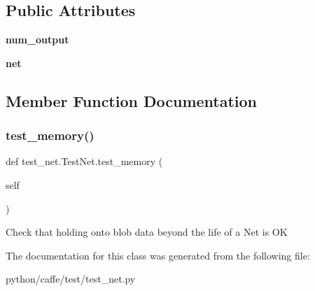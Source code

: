 \subsection*{Public Attributes}
\begin{DoxyCompactItemize}
\item 
\mbox{\label{classtest__net_1_1_test_net_a99560ae34dd066167207d66a4a895a8e}} 
{\bfseries num\+\_\+output}
\item 
\mbox{\label{classtest__net_1_1_test_net_ac07e8487d9fb78ea828aa890f09c2bff}} 
{\bfseries net}
\end{DoxyCompactItemize}


\subsection{Member Function Documentation}
\mbox{\label{classtest__net_1_1_test_net_a124e87079f074a8333dd71e9742e6118}} 
\subsubsection{\texorpdfstring{test\+\_\+memory()}{test\_memory()}}
{\footnotesize\ttfamily def test\+\_\+net.\+Test\+Net.\+test\+\_\+memory (\begin{DoxyParamCaption}\item[{}]{self }\end{DoxyParamCaption})}

\begin{DoxyVerb}Check that holding onto blob data beyond the life of a Net is OK\end{DoxyVerb}
 

The documentation for this class was generated from the following file\+:\begin{DoxyCompactItemize}
\item 
python/caffe/test/test\+\_\+net.\+py\end{DoxyCompactItemize}
